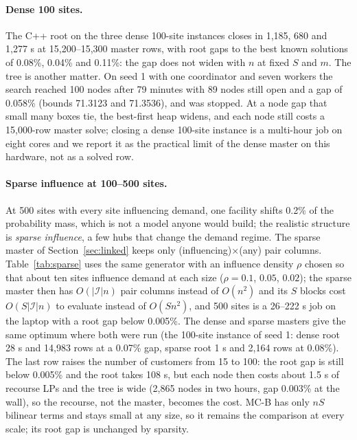 \documentclass[11pt]{article}
\begin{document}
\paragraph{Dense 100 sites.} The C++ root on the three dense 100-site instances closes in 1,185, 680 and 1,277 s at
15,200--15,300 master rows, with root gaps to the best known solutions of 0.08\%, 0.04\% and 0.11\%: the gap does not
widen with $n$ at fixed $S$ and $m$. The tree is another matter. On seed 1 with one coordinator and seven workers the
search reached 100 nodes after 79 minutes with 89 nodes still open and a gap of 0.058\% (bounds 71.3123 and 71.3536),
and was stopped. At a node gap that small many boxes tie, the best-first heap widens, and each node still costs a
15,000-row master solve; closing a dense 100-site instance is a multi-hour job on eight cores and we report it as the
practical limit of the dense master on this hardware, not as a solved row.

\paragraph{Sparse influence at 100--500 sites.} At 500 sites with every site influencing demand, one facility shifts
0.2\% of the probability mass, which is not a model anyone would build; the realistic structure is \emph{sparse
influence}, a few hubs that change the demand regime. The sparse master of Section~\ref{sec:linked} keeps only
(influencing)$\times$(any) pair columns. Table~\ref{tab:sparse} uses the same generator with an influence density
$\rho$ chosen so that about ten sites influence demand at each size ($\rho = 0.1$, $0.05$, $0.02$); the sparse
master then has $O(|\mathcal I|n)$ pair columns instead of $O(n^2)$ and its $S$ blocks cost $O(S|\mathcal I|n)$ to
evaluate instead of $O(Sn^2)$, and 500 sites is a 26--222 s job on the
laptop with a root gap below 0.005\%. The dense and sparse masters give the same optimum where both were run (the
100-site instance of seed 1: dense root 28 s and 14,983 rows at a 0.07\% gap, sparse root 1 s and 2,164 rows at
0.08\%). The last row raises the number of customers from 15 to 100: the root gap is still below 0.005\% and
the root takes 108 s, but each node then costs about 1.5 s of recourse LPs and the tree is wide (2,865 nodes in two
hours, gap 0.003\% at the wall), so the recourse, not the master, becomes the cost. \textsc{MC-B} has only $nS$
bilinear terms and stays small at any size, so it remains the comparison at every scale; its root gap is unchanged by
sparsity.
\end{document}
